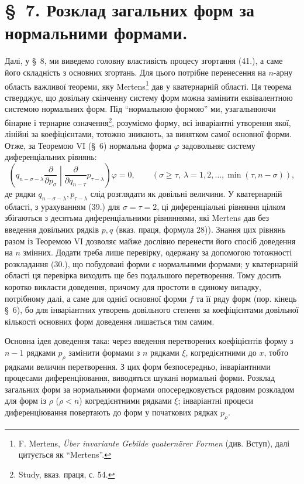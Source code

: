 \documentclass[11pt]{article}
\begin{document}
\section*{\S\ 7. Розклад загальних форм за нормальними формами.}

Далі, у \S\ 8, ми виведемо головну властивість процесу згортання (41.), а саме його складність з основних згортань. Для цього потрібне перенесення на $n$-арну область важливої теореми, яку Mertens\footnote{F. Mertens, \emph{\"Uber invariante Gebilde quatern\"arer Formen} (див. Вступ), далі цитується як ``Mertens''.} дав у кватернарній області. Ця теорема стверджує, що довільну скінченну систему форм можна замінити еквівалентною системою нормальних форм. Під ``нормальною формою'' ми, узагальнюючи бінарне і тернарне означення\footnote{Study, вказ. праця, с. 54.}, розуміємо форму, всі інваріантні утворення якої, лінійні за коефіцієнтами, тотожно зникають, за винятком самої основної форми. Отже, за Теоремою VI (\S\ 6) нормальна форма $\varphi$ задовольняє систему диференціальних рівнянь:
\begin{equation}
 \left(q_{n-\sigma-\lambda}\frac{\partial}{\partial p_\sigma}\middle|\frac{\partial}{\partial q_{n-\tau}}p_{\tau-\lambda}\right)\varphi=0,
 \qquad(\sigma\ge\tau,\ \lambda=1,2,\ldots,\min(\tau,n-\sigma)),
\tag{46}
\end{equation}
де рядки $q_{n-\sigma-\lambda},p_{\tau-\lambda}$ слід розглядати як довільні величини. У кватернарній області, з урахуванням (39.) для $\sigma=\tau=2$, ці диференціальні рівняння цілком збігаються з десятьма диференціальними рівняннями, які Mertens дав без введення довільних рядків $p,q$ (вказ. праця, формула 28)). Знання цих рівнянь разом із Теоремою VI дозволяє майже дослівно перенести його спосіб доведення на $n$ змінних. Додати треба лише перевірку, одержану за допомогою тотожності розкладання (30.), що побудовані форми є нормальними формами; у кватернарній області ця перевірка виходить ще без подальшого перетворення. Тому досить коротко викласти доведення, причому для простоти в єдиному випадку, потрібному далі, а саме для однієї основної форми $f$ та її ряду форм (пор. кінець \S\ 6), бо для інваріантних утворень довільного степеня за коефіцієнтами довільної кількості основних форм доведення лишається тим самим.

Основна ідея доведення така: через введення перетворених коефіцієнтів форму з $n-1$ рядками $p_\rho$ замінити формами з $n$ рядками $\xi$, когредієнтними до $x$, тобто рядками величин перетворення. З цих форм безпосередньо, інваріантними процесами диференціювання, виводяться шукані нормальні форми. Розклад загальних форм за нормальними формами опосередковується рядовим розкладом для форм із $\rho$ ($\rho<n$) когредієнтними рядками $\xi$; інваріантні процеси диференціювання повертають до форм у початкових рядках $p_\rho$.
\end{document}
